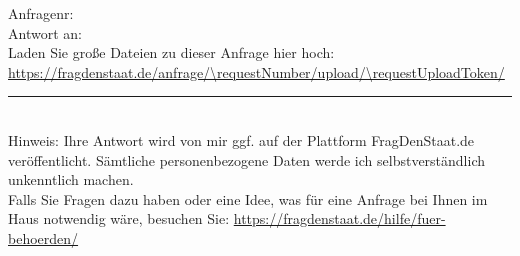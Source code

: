 \documentclass[
paper=a4,
parskip=full,
twoside
]{scrartcl}
\newcommand{\ifequal}[2]{\ifthenelse{\equal{#1}{#2}}}
\newcommand{\ifNonEmpty}[3]{\ifequal{#1}{}{#3}{#2}}
\newcommand{\ifField}[1]{\ifNonEmpty{\field{#1}}}
\begin{document}
{\begin{letter}{%
			}
			\ifField{ps}{
				\ps PS:~{\field{ps}}
			}{}

			\par%
			Anfragenr: \requestNumber \\
			Antwort an:  \\
			Laden Sie gro{\ss}e Dateien zu dieser Anfrage hier hoch:\\
			\url{https://fragdenstaat.de/anfrage/\requestNumber/upload/\requestUploadToken/}

			\par\noindent\rule{0.2\textwidth}{0.4pt}\\
			Hinweis: Ihre Antwort wird von mir ggf. auf der Plattform FragDenStaat.de veröffentlicht. Sämtliche personenbezogene Daten werde ich selbstverständlich unkenntlich machen.\\
			Falls Sie Fragen dazu haben oder eine Idee, was für eine Anfrage bei Ihnen im Haus notwendig wäre, besuchen Sie:
			\url{https://fragdenstaat.de/hilfe/fuer-behoerden/}
	\end{letter}}

	
\end{document}
